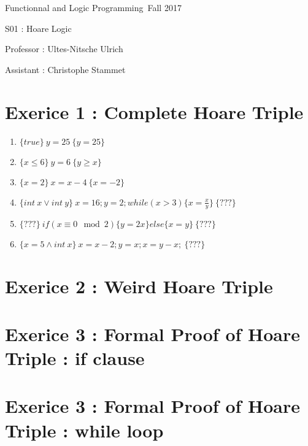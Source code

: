 \documentclass[a4paper,11pt]{report}
\author{Sylvain Julmy}
\date{\today}
\begin{document}
\begin{center}
  \Large{
    Functionnal and Logic Programming\
    Fall 2017
  }
  
  \noindent\makebox[\linewidth]{\rule{\linewidth}{0.4pt}}
  S01 : Hoare Logic
  \noindent\makebox[\linewidth]{\rule{\linewidth}{0.4pt}}

  \begin{flushleft}
    Professor : Ultes-Nitsche Ulrich

    Assistant : Christophe Stammet
  \end{flushleft}

  \noindent\makebox[\linewidth]{\rule{\textwidth}{1pt}}
\end{center}

\section*{Exerice 1 : Complete Hoare Triple}

\begin{enumerate}
\item $\{true\} \ y = 25 \ \{y = 25\}$
\item $\{x \leq 6\} \ y = 6 \ \{y \geq x\}$
\item $\{x=2\} \ x = x - 4 \ \{x=-2\}$
\item $\{int\ x \vee int\ y\} \ x=16;y=2;while(x > 3)\{x = \frac{x}{y}\} \ \{???\}$
\item $\{???\} \ if(x \equiv 0 \mod 2)\{y=2x\} else \{x=y\} \ \{???\}$
\item $\{x=5 \wedge int\ x \} \ x = x-2; y = x; x=y-x; \ \{???\}$
\end{enumerate}

\section*{Exerice 2 : Weird Hoare Triple}

\section*{Exerice 3 : Formal Proof of Hoare Triple : if clause}

\section*{Exerice 3 : Formal Proof of Hoare Triple : while loop}
\end{document}
